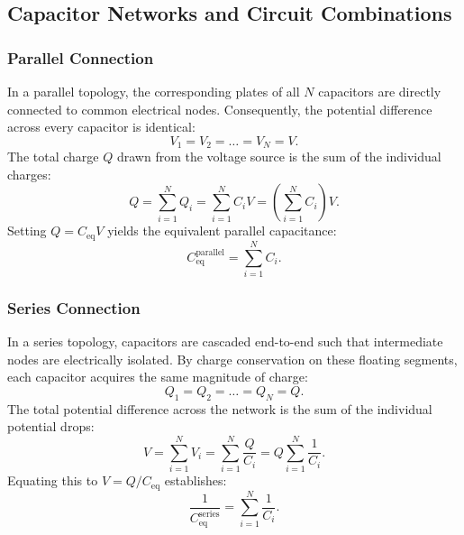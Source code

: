 \subsection{Capacitor Networks and Circuit Combinations}

\subsubsection{Parallel Connection}
In a parallel topology, the corresponding plates of all \(N\) capacitors are directly connected to common electrical nodes. Consequently, the potential difference across every capacitor is identical:
\begin{equation}
    V_1 = V_2 = \dots = V_N = V.
\end{equation}
The total charge \(Q\) drawn from the voltage source is the sum of the individual charges:
\begin{equation}
    Q = \sum_{i=1}^N Q_i = \sum_{i=1}^N C_i V = \left(\sum_{i=1}^N C_i\right) V.
\end{equation}
Setting \(Q = C_{\text{eq}} V\) yields the equivalent parallel capacitance:
\begin{equation}
    C_{\text{eq}}^{\text{parallel}} = \sum_{i=1}^N C_i.
\end{equation}

\subsubsection{Series Connection}
In a series topology, capacitors are cascaded end-to-end such that intermediate nodes are electrically isolated. By charge conservation on these floating segments, each capacitor acquires the same magnitude of charge:
\begin{equation}
    Q_1 = Q_2 = \dots = Q_N = Q.
\end{equation}
The total potential difference across the network is the sum of the individual potential drops:
\begin{equation}
    V = \sum_{i=1}^N V_i = \sum_{i=1}^N \frac{Q}{C_i} = Q \sum_{i=1}^N \frac{1}{C_i}.
\end{equation}
Equating this to \(V = Q / C_{\text{eq}}\) establishes:
\begin{equation}
    \frac{1}{C_{\text{eq}}^{\text{series}}} = \sum_{i=1}^N \frac{1}{C_i}.
\end{equation}

